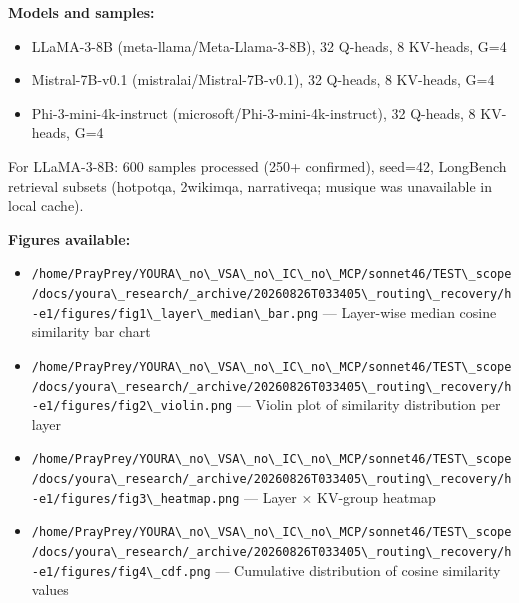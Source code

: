 \textbf{Models and samples:}
\begin{itemize}
\item LLaMA-3-8B (meta-llama/Meta-Llama-3-8B), 32 Q-heads, 8 KV-heads, G=4
\item Mistral-7B-v0.1 (mistralai/Mistral-7B-v0.1), 32 Q-heads, 8 KV-heads, G=4
\item Phi-3-mini-4k-instruct (microsoft/Phi-3-mini-4k-instruct), 32 Q-heads, 8 KV-heads, G=4
\end{itemize}

For LLaMA-3-8B: 600 samples processed (250+ confirmed), seed=42, LongBench retrieval subsets (hotpotqa, 2wikimqa, narrativeqa; musique was unavailable in local cache).

\textbf{Figures available:}
\begin{itemize}
\item \texttt{/home/PrayPrey/YOURA\textbackslash \_no\textbackslash \_VSA\textbackslash \_no\textbackslash \_IC\textbackslash \_no\textbackslash \_MCP/sonnet46/TEST\textbackslash \_scope/docs/youra\textbackslash \_research/\_archive/20260826T033405\textbackslash \_routing\textbackslash \_recovery/h-e1/figures/fig1\textbackslash \_layer\textbackslash \_median\textbackslash \_bar.png} --- Layer-wise median cosine similarity bar chart
\item \texttt{/home/PrayPrey/YOURA\textbackslash \_no\textbackslash \_VSA\textbackslash \_no\textbackslash \_IC\textbackslash \_no\textbackslash \_MCP/sonnet46/TEST\textbackslash \_scope/docs/youra\textbackslash \_research/\_archive/20260826T033405\textbackslash \_routing\textbackslash \_recovery/h-e1/figures/fig2\textbackslash \_violin.png} --- Violin plot of similarity distribution per layer
\item \texttt{/home/PrayPrey/YOURA\textbackslash \_no\textbackslash \_VSA\textbackslash \_no\textbackslash \_IC\textbackslash \_no\textbackslash \_MCP/sonnet46/TEST\textbackslash \_scope/docs/youra\textbackslash \_research/\_archive/20260826T033405\textbackslash \_routing\textbackslash \_recovery/h-e1/figures/fig3\textbackslash \_heatmap.png} --- Layer $\times$ KV-group heatmap
\item \texttt{/home/PrayPrey/YOURA\textbackslash \_no\textbackslash \_VSA\textbackslash \_no\textbackslash \_IC\textbackslash \_no\textbackslash \_MCP/sonnet46/TEST\textbackslash \_scope/docs/youra\textbackslash \_research/\_archive/20260826T033405\textbackslash \_routing\textbackslash \_recovery/h-e1/figures/fig4\textbackslash \_cdf.png} --- Cumulative distribution of cosine similarity values
\end{itemize}


